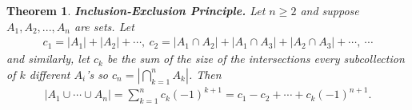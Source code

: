 \documentclass{article}
\theoremstyle{sltheorem}
\newtheorem{theorem}{Theorem}[section]
\begin{document}
\begin{theorem}
    \textbf{Inclusion-Exclusion Principle.} Let $n\geq 2$ and suppose $A_1, A_2, ..., A_n$ are sets. Let
    \begin{align*}
        c_1=|A_1|+|A_2|+\cdots,\:c_2=|A_1\cap A_2|+|A_1\cap A_3|+|A_2\cap A_3|+\cdots,\:\cdots
    \end{align*}
    and similarly, let $c_k$ be the sum of the size of the intersections every subcollection of $k$ different $A_i$'s so $c_n=|\bigcap_{k=1}^n A_k|$. Then
    \begin{align*}
        |A_1\cup \cdots \cup A_n| = \sum_{k=1}^n c_k (-1)^{k+1}=c_1-c_2+\cdots +c_k (-1)^{n+1}.
    \end{align*}
\end{theorem}
\end{document}
